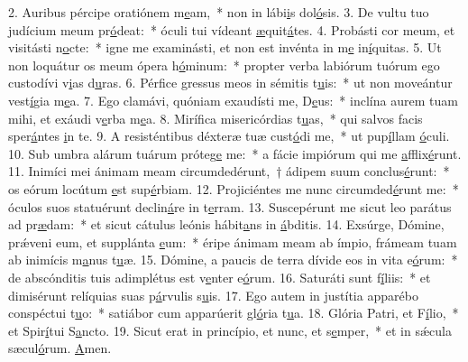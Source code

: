 2. Auribus pércipe oratiónem m\uline{e}am,~* non in lábi\uline{i}s dol\uline{ó}sis.
3. De vultu tuo judícium meum pr\uline{ó}deat:~* óculi tui vídeant \uline{æ}quit\uline{á}tes.
4. Probásti cor meum, et visitásti n\uline{o}cte:~* igne me examinásti, et non est invénta in m\uline{e} in\uline{í}quitas.
5. Ut non loquátur os meum ópera h\uline{ó}minum:~* propter verba labiórum tuórum ego custodívi v\uline{i}as d\uline{u}ras.
6. Pérfice gressus meos in sémitis t\uline{u}is:~* ut non moveántur vest\uline{í}gia m\uline{e}a.
7. Ego clamávi, quóniam exaudísti me, D\uline{e}us:~* inclína aurem tuam mihi, et exáudi v\uline{e}rba m\uline{e}a.
8. Mirífica misericórdias t\uline{u}as,~* qui salvos facis sper\uline{á}ntes \uline{i}n te.
9. A resisténtibus déxteræ tuæ cust\uline{ó}di me,~* ut pup\uline{í}llam \uline{ó}culi.
10. Sub umbra alárum tuárum próteg\uline{e} me:~* a fácie impiórum qui me \uline{a}fflix\uline{é}runt.
11. Inimíci mei ánimam meam circumdedérunt,~† ádipem suum conclus\uline{é}runt:~* os eórum locútum \uline{e}st sup\uline{é}rbiam.
12. Projiciéntes me nunc circumded\uline{é}runt me:~* óculos suos statuérunt declin\uline{á}re in t\uline{e}rram.
13. Suscepérunt me sicut leo parátus ad pr\uline{æ}dam:~* et sicut cátulus leónis hábit\uline{a}ns in \uline{á}bditis.
14. Exsúrge, Dómine, prǽveni eum, et supplánta \uline{e}um:~* éripe ánimam meam ab ímpio, frámeam tuam ab inimícis m\uline{a}nus t\uline{u}æ.
15. Dómine, a paucis de terra dívide eos in vita e\uline{ó}rum:~* de abscónditis tuis adimplétus est v\uline{e}nter e\uline{ó}rum.
16. Saturáti sunt f\uline{í}liis:~* et dimisérunt relíquias suas p\uline{á}rvulis s\uline{u}is.
17. Ego autem in justítia apparébo conspéctui t\uline{u}o:~* satiábor cum apparúerit gl\uline{ó}ria t\uline{u}a.
18. Glória Patri, et F\uline{í}lio,~* et Spir\uline{í}tui S\uline{a}ncto.
19. Sicut erat in princípio, et nunc, et s\uline{e}mper,~* et in sǽcula sæcul\uline{ó}rum. \uline{A}men.
